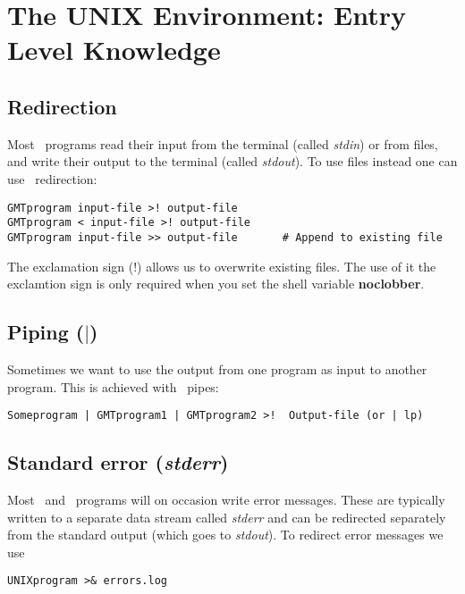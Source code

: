 \documentclass{report}
\begin{document}
\section{The UNIX Environment: Entry Level Knowledge}

\subsection{Redirection}

Most \GMT\ programs read their input from the terminal (called
\emph{stdin}) or from files, and write their output to the
terminal (called \emph{stdout}).  To use files instead one can
use \UNIX\ redirection:

\begin{verbatim}
GMTprogram input-file >! output-file
GMTprogram < input-file >! output-file
GMTprogram input-file >> output-file       # Append to existing file
\end{verbatim}

\noindent
The exclamation sign (!) allows us to overwrite existing files.
The use of it the exclamtion sign is only required when you set the shell variable {\bf noclobber}.

\subsection{Piping ($|$)}

Sometimes we want to use the output from one program as input
to another program.  This is achieved with \UNIX\ pipes:

\begin{verbatim}
Someprogram | GMTprogram1 | GMTprogram2 >!  Output-file (or | lp) 
\end{verbatim}

\subsection{Standard error (\emph{stderr})}

Most \UNIX\ and \GMT\ programs will on occasion write error messages.
These are typically written to a separate data stream called
\emph{stderr} and can be redirected separately from the standard
output (which goes to \emph{stdout}).  To redirect error messages
we use

\begin{verbatim}
UNIXprogram >& errors.log
\end{verbatim}
\end{document}
